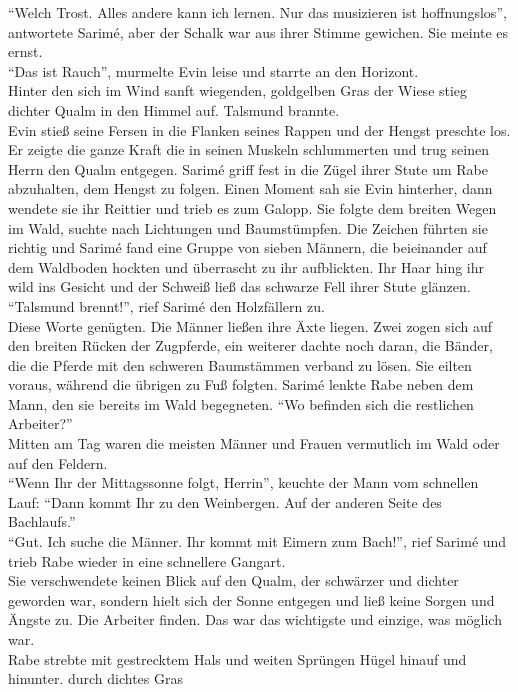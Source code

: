 ``Welch Trost. Alles andere kann ich lernen. Nur das musizieren ist hoffnungslos'', antwortete 
Sarimé, aber der Schalk war aus ihrer Stimme gewichen. Sie meinte es ernst.\\
``Das ist Rauch'', murmelte Evin leise und starrte an den Horizont.\\
Hinter den sich im Wind sanft wiegenden, goldgelben Gras der Wiese stieg dichter Qualm in den 
Himmel auf. Talsmund brannte.\\
Evin stieß seine Fersen in die Flanken seines Rappen und der Hengst preschte los. Er zeigte die 
ganze Kraft die in seinen Muskeln schlummerten und trug seinen Herrn den Qualm entgegen. Sarimé 
griff fest in die Zügel ihrer Stute um Rabe abzuhalten, dem Hengst zu folgen. Einen Moment sah sie 
Evin hinterher, dann wendete sie ihr Reittier und trieb es zum Galopp. Sie folgte dem breiten Wegen 
im Wald, suchte nach Lichtungen und Baumstümpfen. Die Zeichen führten sie richtig und Sarimé fand 
eine Gruppe von sieben Männern, die beieinander auf dem Waldboden hockten und überrascht zu ihr 
aufblickten. Ihr Haar hing ihr wild ins Gesicht und der Schweiß ließ das schwarze Fell ihrer 
Stute glänzen.\\
``Talsmund brennt!'', rief Sarimé den Holzfällern zu.\\
Diese Worte genügten. Die Männer ließen ihre Äxte liegen. Zwei zogen sich auf den breiten Rücken 
der Zugpferde, ein weiterer dachte noch daran, die Bänder, die die Pferde mit den schweren 
Baumstämmen verband zu lösen. Sie eilten voraus, während die übrigen zu Fuß folgten. Sarimé lenkte 
Rabe neben dem Mann, den sie bereits im Wald begegneten. ``Wo befinden sich die restlichen 
Arbeiter?''\\
Mitten am Tag waren die meisten Männer und Frauen vermutlich im Wald oder auf den Feldern.\\
``Wenn Ihr der Mittagssonne folgt, Herrin'', keuchte der Mann vom schnellen Lauf: ``Dann kommt Ihr 
zu den Weinbergen. Auf der anderen Seite des Bachlaufs.''\\
``Gut. Ich suche die Männer. Ihr kommt mit Eimern zum Bach!'', rief Sarimé und trieb Rabe wieder in 
eine schnellere Gangart.\\
Sie verschwendete keinen Blick auf den Qualm, der schwärzer und dichter geworden war, sondern hielt 
sich der Sonne entgegen und ließ keine Sorgen und Ängste zu. Die Arbeiter finden. Das war das 
wichtigste und einzige, was möglich war.\\
Rabe strebte mit gestrecktem Hals und weiten Sprüngen Hügel hinauf und hinunter. durch dichtes Gras 
